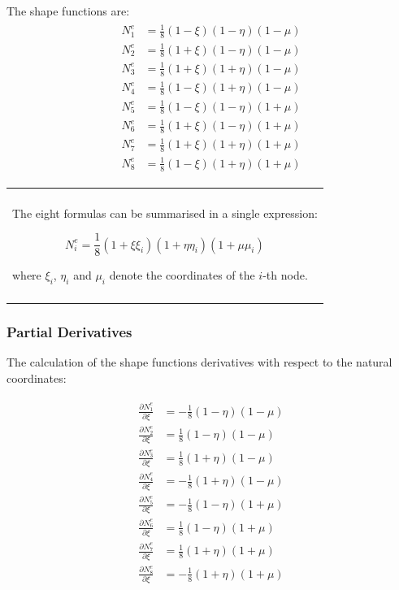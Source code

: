 \documentclass[10pt,b5paper,titlepage]{book}
\newenvironment{bbox}[1][0.96]
{
    \begin{center}
        \begin{tabular}{|p{#1\textwidth}|}
            \hline\\
}
{
            \\\\\hline
        \end{tabular}
    \end{center}
}
\newenvironment{eqarray}
{
    \begin{eqnarray}
        \begin{aligned}
}
{
        \end{aligned}
    \end{eqnarray}
}
\begin{document}
The shape functions are:
\begin{eqarray}
    N_1^e &= \frac{1}{8} \left(1-\xi\right) \left(1-\eta\right) \left(1-\mu\right)\\
    N_2^e &= \frac{1}{8} \left(1+\xi\right) \left(1-\eta\right) \left(1-\mu\right)\\
    N_3^e &= \frac{1}{8} \left(1+\xi\right) \left(1+\eta\right) \left(1-\mu\right)\\
    N_4^e &= \frac{1}{8} \left(1-\xi\right) \left(1+\eta\right) \left(1-\mu\right)\\
    N_5^e &= \frac{1}{8} \left(1-\xi\right) \left(1-\eta\right) \left(1+\mu\right)\\
    N_6^e &= \frac{1}{8} \left(1+\xi\right) \left(1-\eta\right) \left(1+\mu\right)\\
    N_7^e &= \frac{1}{8} \left(1+\xi\right) \left(1+\eta\right) \left(1+\mu\right)\\
    N_8^e &= \frac{1}{8} \left(1-\xi\right) \left(1+\eta\right) \left(1+\mu\right)
\end{eqarray}

\begin{bbox}[0.96]
    The eight formulas can be summarised in a single expression:

    \begin{equation}
        N_i^e = \frac{1}{8}
              \left(1+\xi\xi_i\right)
              \left(1+\eta\eta_i\right)
              \left(1+\mu\mu_i\right)
    \end{equation}

    where $\xi_i$, $\eta_i$ and $\mu_i$ denote the coordinates of the $i$-th node.
\end{bbox}


\subsubsection{Partial Derivatives}
The calculation of the shape functions derivatives with respect to the natural
coordinates:

\begin{eqarray}
    \frac{\partial N_1^e}{\partial\xi} &= -\frac{1}{8} \left(1-\eta\right) \left(1-\mu\right)\\
    \frac{\partial N_2^e}{\partial\xi} &= \frac{1}{8} \left(1-\eta\right) \left(1-\mu\right)\\
    \frac{\partial N_3^e}{\partial\xi} &= \frac{1}{8} \left(1+\eta\right) \left(1-\mu\right)\\
    \frac{\partial N_4^e}{\partial\xi} &= -\frac{1}{8} \left(1+\eta\right) \left(1-\mu\right)\\
    \frac{\partial N_5^e}{\partial\xi} &= -\frac{1}{8} \left(1-\eta\right) \left(1+\mu\right)\\
    \frac{\partial N_6^e}{\partial\xi} &= \frac{1}{8} \left(1-\eta\right) \left(1+\mu\right)\\
    \frac{\partial N_7^e}{\partial\xi} &= \frac{1}{8} \left(1+\eta\right) \left(1+\mu\right)\\
    \frac{\partial N_8^e}{\partial\xi} &= -\frac{1}{8} \left(1+\eta\right) \left(1+\mu\right)
\end{eqarray}
\end{document}
